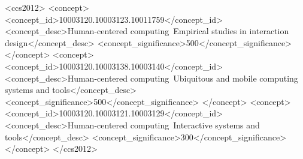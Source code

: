 \documentclass[manuscript,review,anonymous]{acmart}
\begin{document}
\title[]{}

\author{Riku Arakawa}

\author{Mayank Goel}

\author{Antti Ourasvirta}
\orcid{}
\email{}

\renewcommand{\shortauthors}{Arakawa et al.}

\begin{abstract} %

\end{abstract}

\begin{CCSXML}
<ccs2012>
   <concept>
       <concept_id>10003120.10003123.10011759</concept_id>
       <concept_desc>Human-centered computing~Empirical studies in interaction design</concept_desc>
       <concept_significance>500</concept_significance>
       </concept>
   <concept>
       <concept_id>10003120.10003138.10003140</concept_id>
       <concept_desc>Human-centered computing~Ubiquitous and mobile computing systems and tools</concept_desc>
       <concept_significance>500</concept_significance>
       </concept>
   <concept>
       <concept_id>10003120.10003121.10003129</concept_id>
       <concept_desc>Human-centered computing~Interactive systems and tools</concept_desc>
       <concept_significance>300</concept_significance>
       </concept>
 </ccs2012>
\end{CCSXML}


\keywords{}

\maketitle








\end{document}
